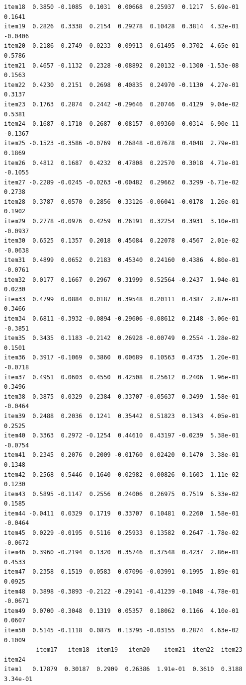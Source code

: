 \documentclass[
  a4paper,
]{ltjsbook}
\begin{document}
\begin{verbatim}
item18  0.3850 -0.1085  0.1031  0.00668  0.25937  0.1217  5.69e-01  0.1641
item19  0.2826  0.3338  0.2154  0.29278  0.10428  0.3814  4.32e-01 -0.0406
item20  0.2186  0.2749 -0.0233  0.09913  0.61495 -0.3702  4.65e-01  0.5786
item21  0.4657 -0.1132  0.2328 -0.08892  0.20132 -0.1300 -1.53e-08  0.1563
item22  0.4230  0.2151  0.2698  0.40835  0.24970 -0.1130  4.27e-01  0.3137
item23  0.1763  0.2874  0.2442 -0.29646  0.20746  0.4129  9.04e-02  0.5381
item24  0.1687 -0.1710  0.2687 -0.08157 -0.09360 -0.0314 -6.90e-11 -0.1367
item25 -0.1523 -0.3586 -0.0769  0.26848 -0.07678  0.4048  2.79e-01  0.1869
item26  0.4812  0.1687  0.4232  0.47808  0.22570  0.3018  4.71e-01 -0.1055
item27 -0.2289 -0.0245 -0.0263 -0.00482  0.29662  0.3299 -6.71e-02  0.2738
item28  0.3787  0.0570  0.2856  0.33126 -0.06041 -0.0178  1.26e-01  0.1902
item29  0.2778 -0.0976  0.4259  0.26191  0.32254  0.3931  3.10e-01 -0.0937
item30  0.6525  0.1357  0.2018  0.45084  0.22078  0.4567  2.01e-02 -0.0638
item31  0.4899  0.0652  0.2183  0.45340  0.24160  0.4386  4.80e-01 -0.0761
item32  0.0177  0.1667  0.2967  0.31999  0.52564 -0.2437  1.94e-01  0.0230
item33  0.4799  0.0884  0.0187  0.39548  0.20111  0.4387  2.87e-01  0.3466
item34  0.6811 -0.3932 -0.0894 -0.29606 -0.08612  0.2148 -3.06e-01 -0.3851
item35  0.3435  0.1183 -0.2142  0.26928 -0.00749  0.2554 -1.28e-02  0.1501
item36  0.3917 -0.1069  0.3860  0.00689  0.10563  0.4735  1.20e-01 -0.0718
item37  0.4951  0.0603  0.4550  0.42508  0.25612  0.2406  1.96e-01  0.3496
item38  0.3875  0.0329  0.2384  0.33707 -0.05637  0.3499  1.58e-01 -0.0464
item39  0.2488  0.2036  0.1241  0.35442  0.51823  0.1343  4.05e-01  0.2525
item40  0.3363  0.2972 -0.1254  0.44610  0.43197 -0.0239  5.38e-01 -0.0754
item41  0.2345  0.2076  0.2009 -0.01760  0.02420  0.1470  3.38e-01  0.1348
item42  0.2568  0.5446  0.1640 -0.02982 -0.00826  0.1603  1.11e-02  0.1230
item43  0.5895 -0.1147  0.2556  0.24006  0.26975  0.7519  6.33e-02  0.1585
item44 -0.0411  0.0329  0.1719  0.33707  0.10481  0.2260  1.58e-01 -0.0464
item45  0.0229 -0.0195  0.5116  0.25933  0.13582  0.2647 -1.78e-02 -0.0672
item46  0.3960 -0.2194  0.1320  0.35746  0.37548  0.4237  2.86e-01  0.4533
item47  0.2358  0.1519  0.0583  0.07096 -0.03991  0.1995  1.89e-01  0.0925
item48  0.3898 -0.3893 -0.2122 -0.29141 -0.41239 -0.1048 -4.78e-01 -0.0671
item49  0.0700 -0.3048  0.1319  0.05357  0.18062  0.1166  4.10e-01  0.0607
item50  0.5145 -0.1118  0.0875  0.13795 -0.03155  0.2874  4.63e-02  0.1009
         item17   item18  item19   item20    item21  item22  item23    item24
item1   0.17879  0.30187  0.2909  0.26386  1.91e-01  0.3610  0.3188  3.34e-01

\end{verbatim}
\end{document}
